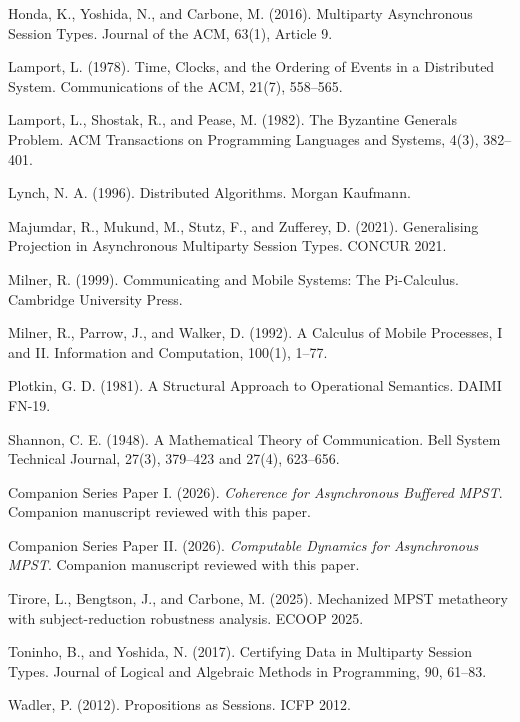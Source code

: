 \documentclass[a4paper,10pt,twocolumn,english]{article}
\numberwithin{equation}{section}
\theoremstyle{paperdef}
\theoremstyle{paperplain}
\theoremstyle{paperdef}
\theoremstyle{paperremark}
\theoremstyle{paperdef}
\newenvironment{citelist}{%
  \begin{list}{}{%
    \setlength{\leftmargin}{1.25em}%
    \setlength{\itemindent}{-1.25em}%
    \setlength{\itemsep}{2pt}%
    \setlength{\parsep}{0pt}%
    \setlength{\topsep}{3pt}}%
}{\end{list}}
\begin{document}
\begin{citelist}
	\item Honda, K., Yoshida, N., and Carbone, M. (2016). Multiparty Asynchronous Session Types. Journal of the ACM, 63(1), Article 9.
	\item Lamport, L. (1978). Time, Clocks, and the Ordering of Events in a Distributed System. Communications of the ACM, 21(7), 558--565.
	\item Lamport, L., Shostak, R., and Pease, M. (1982). The Byzantine Generals Problem. ACM Transactions on Programming Languages and Systems, 4(3), 382--401.
	\item Lynch, N. A. (1996). Distributed Algorithms. Morgan Kaufmann.
	\item Majumdar, R., Mukund, M., Stutz, F., and Zufferey, D. (2021). Generalising Projection in Asynchronous Multiparty Session Types. CONCUR 2021.
	\item Milner, R. (1999). Communicating and Mobile Systems: The Pi-Calculus. Cambridge University Press.
	\item Milner, R., Parrow, J., and Walker, D. (1992). A Calculus of Mobile Processes, I and II. Information and Computation, 100(1), 1--77.
	\item Plotkin, G. D. (1981). A Structural Approach to Operational Semantics. DAIMI FN-19.
	\item Shannon, C. E. (1948). A Mathematical Theory of Communication. Bell System Technical Journal, 27(3), 379--423 and 27(4), 623--656.
	\item Companion Series Paper I. (2026). \emph{Coherence for Asynchronous Buffered MPST}. Companion manuscript reviewed with this paper.
	\item Companion Series Paper II. (2026). \emph{Computable Dynamics for Asynchronous MPST}. Companion manuscript reviewed with this paper.
	\item Tirore, L., Bengtson, J., and Carbone, M. (2025). Mechanized MPST metatheory with subject-reduction robustness analysis. ECOOP 2025.
	\item Toninho, B., and Yoshida, N. (2017). Certifying Data in Multiparty Session Types. Journal of Logical and Algebraic Methods in Programming, 90, 61--83.
	\item Wadler, P. (2012). Propositions as Sessions. ICFP 2012.
\end{citelist}

\clearpage
\appendix
{}
\vspace{1em}
\end{document}
